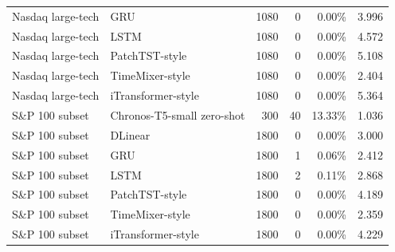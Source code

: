 \begin{center}
{\begin{tabular}{llrrrr}
Nasdaq large-tech & GRU & 1080 & 0 & 0.00\% & 3.996 \\
Nasdaq large-tech & LSTM & 1080 & 0 & 0.00\% & 4.572 \\
Nasdaq large-tech & PatchTST-style & 1080 & 0 & 0.00\% & 5.108 \\
Nasdaq large-tech & TimeMixer-style & 1080 & 0 & 0.00\% & 2.404 \\
Nasdaq large-tech & iTransformer-style & 1080 & 0 & 0.00\% & 5.364 \\
S\&P 100 subset & Chronos-T5-small zero-shot & 300 & 40 & 13.33\% & 1.036 \\
S\&P 100 subset & DLinear & 1800 & 0 & 0.00\% & 3.000 \\
S\&P 100 subset & GRU & 1800 & 1 & 0.06\% & 2.412 \\
S\&P 100 subset & LSTM & 1800 & 2 & 0.11\% & 2.868 \\
S\&P 100 subset & PatchTST-style & 1800 & 0 & 0.00\% & 4.189 \\
S\&P 100 subset & TimeMixer-style & 1800 & 0 & 0.00\% & 2.359 \\
S\&P 100 subset & iTransformer-style & 1800 & 0 & 0.00\% & 4.229 \\
\bottomrule
\end{tabular}
}
\end{center}

